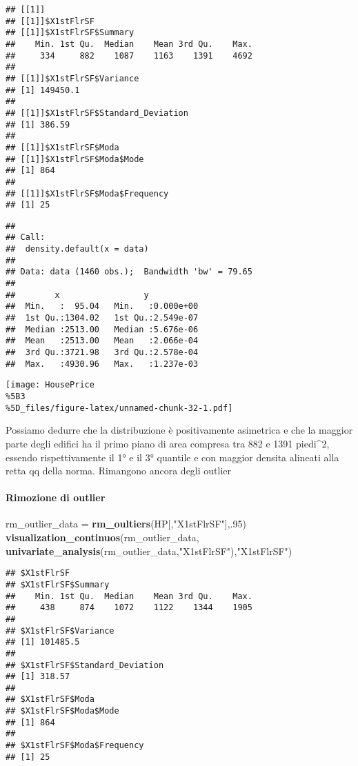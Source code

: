 \documentclass[
]{article}
\newenvironment{Shaded}{\begin{snugshade}}{\end{snugshade}}
\newcommand{\DecValTok}[1]{\textcolor[rgb]{0.00,0.00,0.81}{#1}}
\newcommand{\FunctionTok}[1]{\textcolor[rgb]{0.13,0.29,0.53}{\textbf{#1}}}
\newcommand{\NormalTok}[1]{#1}
\newcommand{\OtherTok}[1]{\textcolor[rgb]{0.56,0.35,0.01}{#1}}
\newcommand{\StringTok}[1]{\textcolor[rgb]{0.31,0.60,0.02}{#1}}
\begin{document}
\begin{verbatim}
## [[1]]
## [[1]]$X1stFlrSF
## [[1]]$X1stFlrSF$Summary
##    Min. 1st Qu.  Median    Mean 3rd Qu.    Max. 
##     334     882    1087    1163    1391    4692 
## 
## [[1]]$X1stFlrSF$Variance
## [1] 149450.1
## 
## [[1]]$X1stFlrSF$Standard_Deviation
## [1] 386.59
## 
## [[1]]$X1stFlrSF$Moda
## [[1]]$X1stFlrSF$Moda$Mode
## [1] 864
## 
## [[1]]$X1stFlrSF$Moda$Frequency
## [1] 25
\end{verbatim}

\begin{verbatim}
## 
## Call:
##  density.default(x = data)
## 
## Data: data (1460 obs.);  Bandwidth 'bw' = 79.65
## 
##        x                 y            
##  Min.   :  95.04   Min.   :0.000e+00  
##  1st Qu.:1304.02   1st Qu.:2.549e-07  
##  Median :2513.00   Median :5.676e-06  
##  Mean   :2513.00   Mean   :2.066e-04  
##  3rd Qu.:3721.98   3rd Qu.:2.578e-04  
##  Max.   :4930.96   Max.   :1.237e-03
\end{verbatim}

\texttt{[image: HousePrice\\\%5B3\\\%5D\_files/figure-latex/unnamed-chunk-32-1.pdf]}

Possiamo dedurre che la distribuzione è positivamente asimetrica e che
la maggior parte degli edifici ha il primo piano di area compresa tra
882 e 1391 piedi\^{}2, essendo rispettivamente il 1° e il 3° quantile e
con maggior densita alineati alla retta qq della norma. Rimangono ancora
degli outlier

\paragraph{Rimozione di outlier}\label{rimozione-di-outlier-6}

\begin{Shaded}
\begin{Highlighting}[]
\NormalTok{rm\_outlier\_data }\OtherTok{=} \FunctionTok{rm\_oultiers}\NormalTok{(HP[,}\StringTok{"X1stFlrSF"}\NormalTok{],.}\DecValTok{95}\NormalTok{)}
\FunctionTok{visualization\_continuos}\NormalTok{(rm\_outlier\_data, }\FunctionTok{univariate\_analysis}\NormalTok{(rm\_outlier\_data,}\StringTok{"X1stFlrSF"}\NormalTok{),}\StringTok{"X1stFlrSF"}\NormalTok{)}
\end{Highlighting}
\end{Shaded}

\begin{verbatim}
## $X1stFlrSF
## $X1stFlrSF$Summary
##    Min. 1st Qu.  Median    Mean 3rd Qu.    Max. 
##     438     874    1072    1122    1344    1905 
## 
## $X1stFlrSF$Variance
## [1] 101485.5
## 
## $X1stFlrSF$Standard_Deviation
## [1] 318.57
## 
## $X1stFlrSF$Moda
## $X1stFlrSF$Moda$Mode
## [1] 864
## 
## $X1stFlrSF$Moda$Frequency
## [1] 25
\end{verbatim}
\end{document}
